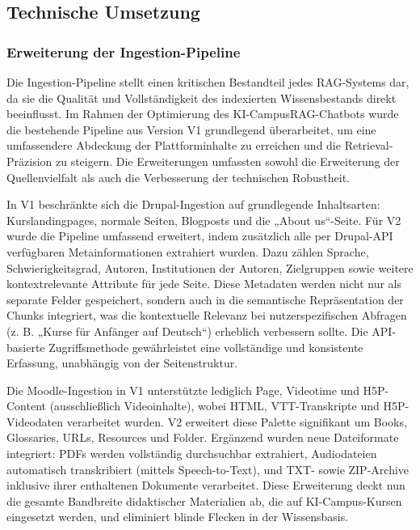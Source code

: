 \subsection{Technische Umsetzung}
\label{sec:technische_umsetzung}

\subsubsection{Erweiterung der Ingestion-Pipeline}
Die Ingestion-Pipeline stellt einen kritischen Bestandteil jedes RAG-Systems dar, da sie die Qualität und Vollständigkeit des indexierten Wissensbestands direkt beeinflusst. Im Rahmen der Optimierung des KI-CampusRAG-Chatbots wurde die bestehende Pipeline aus Version V1 grundlegend überarbeitet, um eine umfassendere Abdeckung der Plattforminhalte zu erreichen und die Retrieval-Präzision zu steigern. Die Erweiterungen umfassten sowohl die Erweiterung der Quellenvielfalt als auch die Verbesserung der technischen Robustheit.

In V1 beschränkte sich die Drupal-Ingestion auf grundlegende Inhaltsarten: Kurslandingpages, normale Seiten, Blogposts und die „About us“-Seite. Für V2 wurde die Pipeline umfassend erweitert, indem zusätzlich alle per Drupal-API verfügbaren Metainformationen extrahiert wurden. Dazu zählen Sprache, Schwierigkeitsgrad, Autoren, Institutionen der Autoren, Zielgruppen sowie weitere kontextrelevante Attribute für jede Seite. Diese Metadaten werden nicht nur als separate Felder gespeichert, sondern auch in die semantische Repräsentation der Chunks integriert, was die kontextuelle Relevanz bei nutzerspezifischen Abfragen (z. B. „Kurse für Anfänger auf Deutsch“) erheblich verbessern sollte. Die API-basierte Zugriffsmethode gewährleistet eine vollständige und konsistente Erfassung, unabhängig von der Seitenstruktur.

Die Moodle-Ingestion in V1 unterstützte lediglich Page, Videotime und H5P-Content (ausschließlich Videoinhalte), wobei HTML, VTT-Transkripte und H5P-Videodaten verarbeitet wurden. V2 erweitert diese Palette signifikant um Books, Glossaries, URLs, Resources und Folder. Ergänzend wurden neue Dateiformate integriert: PDFs werden vollständig durchsuchbar extrahiert, Audiodateien automatisch transkribiert (mittels Speech-to-Text), und TXT- sowie ZIP-Archive inklusive ihrer enthaltenen Dokumente verarbeitet. Diese Erweiterung deckt nun die gesamte Bandbreite didaktischer Materialien ab, die auf KI-Campus-Kursen eingesetzt werden, und eliminiert blinde Flecken in der Wissensbasis.

